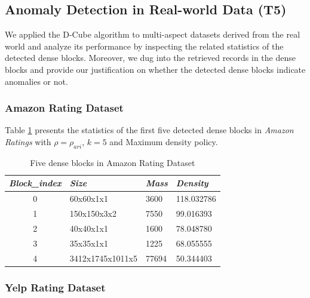 \subsection{Anomaly Detection in Real-world Data (T5)}

We applied the D-Cube algorithm to multi-aspect datasets derived from the real world and analyze its performance by inspecting the related statistics of the detected dense blocks. Moreover, we dug into the retrieved records in the dense blocks and provide our justification on whether the detected dense blocks indicate anomalies or not. 

\subsubsection{Amazon Rating Dataset}

Table \ref{tab:amazon} presents the statistics of the first five detected dense blocks in \textit{Amazon Ratings} with $\rho=\rho_{ari}$, $k=5$ and Maximum density policy.  

\renewcommand{\arraystretch}{1.5}
\begin{table}[!ht]
\centering
\caption{Five dense blocks in Amazon Rating Dataset}
\label{tab:amazon}
\begin{tabular}{|c|p{4cm}|p{2cm}|p{3cm}|}
\hline
\textit{\textbf{Block\_index}} & \textit{\textbf{Size}} & \textit{\textbf{Mass}} & \textit{\textbf{Density}} \\ \hline
{0}                     & 60x60x1x1                 & 3600                               & 118.032786                           \\ \hline
{1}                     & 150x150x3x2                 & 7550                               & 99.016393                          \\ \hline
{2}                     & 40x40x1x1                 & 1600                               & 78.048780                           \\ \hline
{3}                     & 35x35x1x1                  & 1225                                & 68.055555                           \\ \hline
{4}                     & 3412x1745x1011x5                 & 77694                                & 50.344403                           \\ \hline
\end{tabular}
\end{table}

\subsubsection{Yelp Rating Dataset}


